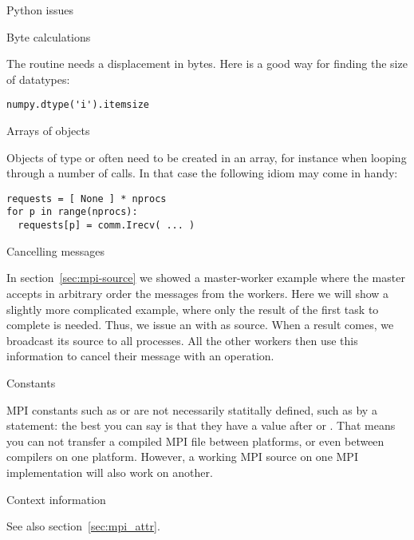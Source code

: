 
 {Python issues}
\label{sec:python-stuff}

 {Byte calculations}

The  routine needs a displacement in
bytes. Here is a good way for finding the size of  datatypes:
\lstset{language=Python}
\begin{lstlisting}
numpy.dtype('i').itemsize
\end{lstlisting}

 {Arrays of objects}

Objects of type  or  often need to be created
in an array, for instance when looping through a number of  calls.
In that case the following idiom may come in handy:
\begin{lstlisting}
requests = [ None ] * nprocs
for p in range(nprocs):
  requests[p] = comm.Irecv( ... )
\end{lstlisting}
\lstset{language=C}


 {Cancelling messages}

In section~\ref{sec:mpi-source} we showed a master-worker example where the 
master accepts in arbitrary order the messages from the workers.
Here we will show a slightly
more complicated example, where only the result of the first task to
complete is needed. Thus, we issue an 
with  as source.  When a result comes, we
broadcast its source to all processes.  All the other workers then use
this information to cancel their message with
an  operation.


 {Constants}

MPI constants such as  or  are not
necessarily statitally defined, such as by a  statement:
the best you can say is that they have a value after
 or .
That means you can not transfer a compiled MPI file between
platforms, or even between compilers on one platform.
However, a working MPI source on one MPI implementation
will also work on another.

 {Context information}
\label{sec:context}

See also section~\ref{sec:mpi_attr}.

